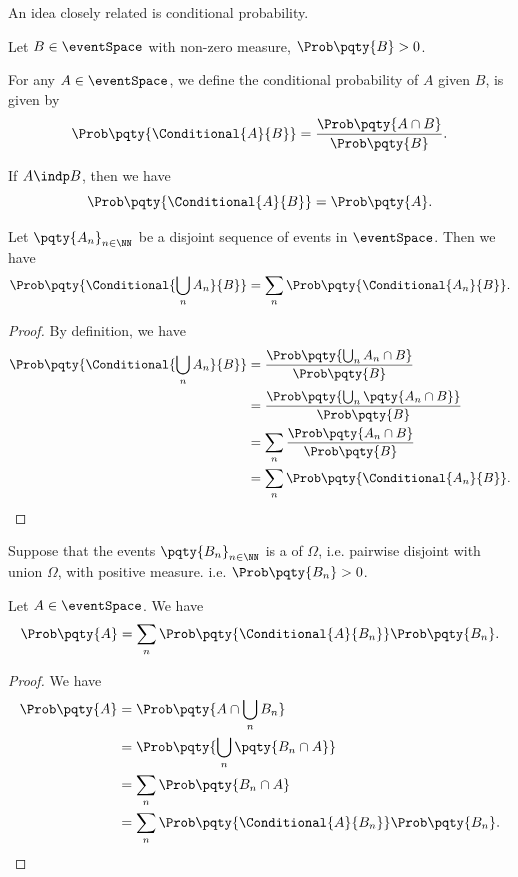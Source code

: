 An idea closely related is conditional probability.

\begin{definition}
    \label{def:conditional-prob}%
    Let \(B \in \eventSpace\) with non-zero measure, \(\Prob\pqty{B} > 0\).

    For any \(A \in \eventSpace\), we define the conditional probability of \(A\) given \(B\), is given by
    \[
        \Prob\pqty{\Conditional{A}{B}} = \frac{\Prob\pqty{A \cap B}}{\Prob\pqty{B}}.
    \]
\end{definition}

If \(A \indp B\), then we have
\[
    \Prob\pqty{\Conditional{A}{B}} = \Prob\pqty{A}.
\]

\begin{proposition}
    \label{prop:countable-additivity-conditional}%
    Let \(\pqty{A_n}_{n \in \NN}\) be a disjoint sequence of events in \(\eventSpace\). Then we have
    \[
        \Prob\pqty{\Conditional{\bigcup_n A_n}{B}} = \sum_{n} \Prob\pqty{\Conditional{A_n}{B}}.
    \]
\end{proposition}

\begin{proof}
    By definition, we have
    \begin{align*}
        \Prob\pqty{\Conditional{\bigcup_{n} A_n}{B}} &= \frac{\Prob\pqty{\bigcup_n A_n \cap B}}{\Prob\pqty{B}} \\
        &= \frac{\Prob\pqty{\bigcup_n \pqty{A_n \cap B}}}{\Prob\pqty{B}} \\
        &= \sum_{n} \frac{\Prob\pqty{A_n \cap B}}{\Prob\pqty{B}} \\
        &= \sum_{n} \Prob\pqty{\Conditional{A_n}{B}}.
    \end{align*}
\end{proof}

\begin{theorem}
    \label{thm:law-total-probability}%
    Suppose that the events \(\pqty{B_n}_{n \in \NN}\) is a  of \(\Omega\), i.e. pairwise disjoint with union \(\Omega\), with positive measure. i.e. \(\Prob\pqty{B_n} > 0\).

    Let \(A \in \eventSpace\). We have
    \[
        \Prob\pqty{A} = \sum_{n} \Prob\pqty{\Conditional{A}{B_n}} \Prob\pqty{B_n}.
    \]
\end{theorem}

\begin{proof}
    We have
    \begin{align*}
        \Prob\pqty{A} &= \Prob\pqty{A \cap \bigcup_{n} B_n} \\
        &= \Prob\pqty{\bigcup_n \pqty{B_n \cap A}} \\
        &= \sum_{n} \Prob\pqty{B_n \cap A} \\
        &= \sum_{n} \Prob\pqty{\Conditional{A}{B_n}} \Prob\pqty{B_n}.
    \end{align*}
\end{proof}

